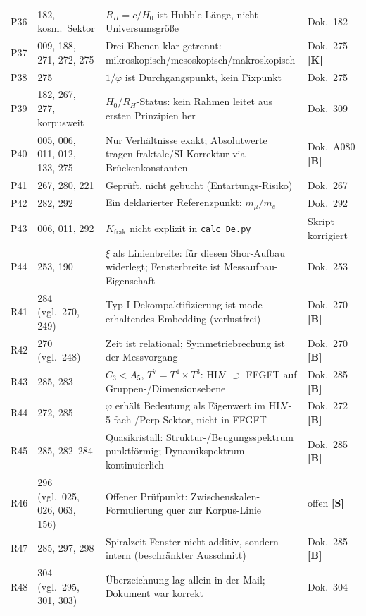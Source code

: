 \begin{longtable}{@{}p{1.2cm}p{3.4cm}p{5.8cm}p{3.4cm}@{}}
P36 & 182, kosm.\ Sektor & $R_H = c/H_0$ ist Hubble-Länge, nicht Universumsgröße & Dok.~182 \\
P37 & 009, 188, 271, 272, 275 & Drei Ebenen klar getrennt: mikroskopisch/mesoskopisch/makroskopisch & Dok.~275 \textbf{[K]} \\
P38 & 275 & $1/\varphi$ ist Durchgangspunkt, kein Fixpunkt & Dok.~275 \\
P39 & 182, 267, 277, korpusweit & $H_0/R_H$-Status: kein Rahmen leitet aus ersten Prinzipien her & Dok.~309 \\
P40 & 005, 006, 011, 012, 133, 275 & Nur Verhältnisse exakt; Absolutwerte tragen fraktale/SI-Korrektur via Brückenkonstanten & Dok.~A080 \textbf{[B]} \\
P41 & 267, 280, 221 & Geprüft, nicht gebucht (Entartungs-Risiko) & Dok.~267 \\
P42 & 282, 292 & Ein deklarierter Referenzpunkt: $m_\mu/m_e$ & Dok.~292 \\
P43 & 006, 011, 292 & $K_{\text{frak}}$ nicht explizit in \texttt{calc\_De.py} & Skript korrigiert \\
P44 & 253, 190 & $\xi$ als Linienbreite: für diesen Shor-Aufbau widerlegt; Fensterbreite ist Messaufbau-Eigenschaft & Dok.~253 \\
R41 & 284 (vgl.\ 270, 249) & Typ-I-Dekompaktifizierung ist mode-erhaltendes Embedding (verlustfrei) & Dok.~270 \textbf{[B]} \\
R42 & 270 (vgl.\ 248) & Zeit ist relational; Symmetriebrechung ist der Messvorgang & Dok.~270 \textbf{[B]} \\
R43 & 285, 283 & $C_3<A_5$, $T^7=T^4\times T^3$: HLV $\supset$ FFGFT auf Gruppen-/Dimensionsebene & Dok.~285 \textbf{[B]} \\
R44 & 272, 285 & $\varphi$ erhält Bedeutung als Eigenwert im HLV-5-fach-/Perp-Sektor, nicht in FFGFT & Dok.~272 \textbf{[B]} \\
R45 & 285, 282--284 & Quasikristall: Struktur-/Beugungsspektrum punktförmig; Dynamikspektrum kontinuierlich & Dok.~285 \textbf{[B]} \\
R46 & 296 (vgl.\ 025, 026, 063, 156) & Offener Prüfpunkt: Zwischenskalen-Formulierung quer zur Korpus-Linie & offen \textbf{[S]} \\
R47 & 285, 297, 298 & Spiralzeit-Fenster nicht additiv, sondern intern (beschränkter Ausschnitt) & Dok.~285 \textbf{[B]} \\
R48 & 304 (vgl.\ 295, 301, 303) & Überzeichnung lag allein in der Mail; Dokument war korrekt & Dok.~304 \\

\end{longtable}
